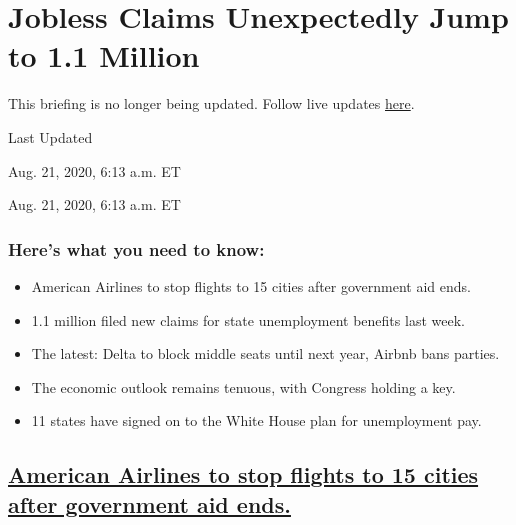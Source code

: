 \hypertarget{jobless-claims-unexpectedly-jump-to-11-million}{%
\section{Jobless Claims Unexpectedly Jump to 1.1
Million}\label{jobless-claims-unexpectedly-jump-to-11-million}}

This briefing is no longer being updated. Follow live updates
\href{https://www.nytimes3xbfgragh.onion/2020/08/20/world/coronavirus-covid.html}{here}.

Last Updated

Aug. 21, 2020, 6:13 a.m. ET

Aug. 21, 2020, 6:13 a.m. ET

\hypertarget{heres-what-you-need-to-know}{%
\subsubsection{Here's what you need to
know:}\label{heres-what-you-need-to-know}}

\begin{itemize}
\item
  \protect\hyperlink{american-airlines-to-stop-flights-to-15-cities-after-government-aid-ends}{}

  American Airlines to stop flights to 15 cities after government aid
  ends.
\item
  \protect\hyperlink{1-1-million-filed-new-claims-for-state-unemployment-benefits-last-week}{}

  1.1 million filed new claims for state unemployment benefits last
  week.
\item
  \protect\hyperlink{the-latest-delta-to-block-middle-seats-until-next-year-airbnb-bans-parties}{}

  The latest: Delta to block middle seats until next year, Airbnb bans
  parties.
\item
  \protect\hyperlink{the-economic-outlook-remains-tenuous-with-congress-holding-a-key}{}

  The economic outlook remains tenuous, with Congress holding a key.
\item
  \protect\hyperlink{11-states-have-signed-on-to-the-white-house-plan-for-unemployment-pay}{}

  11 states have signed on to the White House plan for unemployment pay.
\end{itemize}

\hypertarget{american-airlines-to-stop-flights-to-15-cities-after-government-aid-ends}{%
\subsection{\texorpdfstring{\protect\hyperlink{american-airlines-to-stop-flights-to-15-cities-after-government-aid-ends}{American
Airlines to stop flights to 15 cities after government aid
ends.}}{American Airlines to stop flights to 15 cities after government aid ends.}}\label{american-airlines-to-stop-flights-to-15-cities-after-government-aid-ends}}

